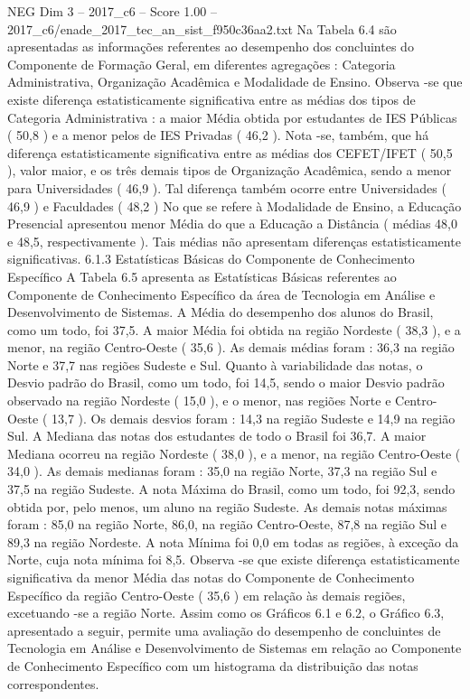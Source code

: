 \begin{textsample}{NEG Dim 3 – 2017\_c6 – Score 1.00 – 2017\_c6/enade\_2017\_tec\_an\_sist\_f950c36aa2.txt}
Na Tabela 6.4 são apresentadas as informações referentes ao desempenho dos concluintes do Componente de Formação Geral, em diferentes agregações : Categoria Administrativa, Organização Acadêmica e Modalidade de Ensino.
Observa -se que existe diferença estatisticamente significativa entre as médias dos tipos de Categoria Administrativa : a maior Média obtida por estudantes de IES Públicas ( 50,8 ) e a menor pelos de IES Privadas ( 46,2 ).
Nota -se, também, que há diferença estatisticamente significativa entre as médias dos CEFET/IFET ( 50,5 ), valor maior, e os três demais tipos de Organização Acadêmica, sendo a menor para Universidades ( 46,9 ).
Tal diferença também ocorre entre Universidades ( 46,9 ) e Faculdades ( 48,2 ) No que se refere à Modalidade de Ensino, a Educação Presencial apresentou menor Média do que a Educação a Distância ( médias 48,0 e 48,5, respectivamente ).
Tais médias não apresentam diferenças estatisticamente significativas. 6.1.3 Estatísticas Básicas do Componente de Conhecimento Específico A Tabela 6.5 apresenta as Estatísticas Básicas referentes ao Componente de Conhecimento Específico da área de Tecnologia em Análise e Desenvolvimento de Sistemas.
A Média do desempenho dos alunos do Brasil, como um todo, foi 37,5.
A maior Média foi obtida na região Nordeste ( 38,3 ), e a menor, na região Centro-Oeste ( 35,6 ).
As demais médias foram : 36,3 na região Norte e 37,7 nas regiões Sudeste e Sul.
Quanto à variabilidade das notas, o Desvio padrão do Brasil, como um todo, foi 14,5, sendo o maior Desvio padrão observado na região Nordeste ( 15,0 ), e o menor, nas regiões Norte e Centro-Oeste ( 13,7 ).
Os demais desvios foram : 14,3 na região Sudeste e 14,9 na região Sul.
A Mediana das notas dos estudantes de todo o Brasil foi 36,7.
A maior Mediana ocorreu na região Nordeste ( 38,0 ), e a menor, na região Centro-Oeste ( 34,0 ).
As demais medianas foram : 35,0 na região Norte, 37,3 na região Sul e 37,5 na região Sudeste.
A nota Máxima do Brasil, como um todo, foi 92,3, sendo obtida por, pelo menos, um aluno na região Sudeste.
As demais notas máximas foram : 85,0 na região Norte, 86,0, na região Centro-Oeste, 87,8 na região Sul e 89,3 na região Nordeste.
A nota Mínima foi 0,0 em todas as regiões, à exceção da Norte, cuja nota mínima foi 8,5.
Observa -se que existe diferença estatisticamente significativa da menor Média das notas do Componente de Conhecimento Específico da região Centro-Oeste ( 35,6 ) em relação às demais regiões, excetuando -se a região Norte.
Assim como os Gráficos 6.1 e 6.2, o Gráfico 6.3, apresentado a seguir, permite uma avaliação do desempenho de concluintes de Tecnologia em Análise e Desenvolvimento de Sistemas em relação ao Componente de Conhecimento Específico com um histograma da distribuição das notas correspondentes.

\end{textsample}
